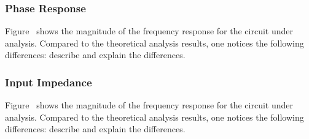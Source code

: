 

\subsubsection{Phase Response}

Figure~%
shows the magnitude of the frequency response for the circuit under analysis. Compared to the theoretical analysis results, one notices the following differences: describe and explain the differences.


\subsubsection{Input Impedance}

Figure~
shows the magnitude of the frequency response for the circuit under analysis. Compared to the theoretical analysis results, one notices the following differences: describe and explain the differences.





